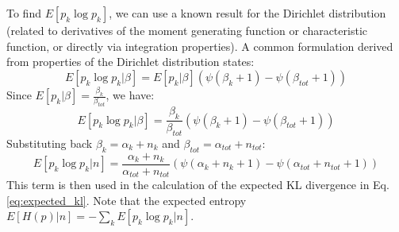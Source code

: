 \documentclass[journal]{IEEEtran}
\begin{document}
To find $E[p_k \log p_k]$, we can use a known result for the Dirichlet distribution (related to derivatives of the moment generating function or characteristic function, or directly via integration properties). A common formulation derived from properties of the Dirichlet distribution states:
\begin{equation}
E[p_k \log p_k | \beta] = E[p_k | \beta] \left( \psi(\beta_k + 1) - \psi(\beta_{tot} + 1) \right)
\end{equation}
Since $E[p_k | \beta] = \frac{\beta_k}{\beta_{tot}}$, we have:
\begin{equation}
E[p_k \log p_k | \beta] = \frac{\beta_k}{\beta_{tot}} \left( \psi(\beta_k + 1) - \psi(\beta_{tot} + 1) \right)
\end{equation}
Substituting back $\beta_k = \alpha_k + n_k$ and $\beta_{tot} = \alpha_{tot} + n_{tot}$:
\begin{equation}
E[p_k \log p_k | n] = \frac{\alpha_k + n_k}{\alpha_{tot} + n_{tot}} \left( \psi(\alpha_k + n_k + 1) - \psi(\alpha_{tot} + n_{tot} + 1) \right)
\end{equation}
This term is then used in the calculation of the expected KL divergence in Eq. \ref{eq:expected_kl}. Note that the expected entropy $E[H(p)|n] = - \sum_k E[p_k \log p_k | n]$.



\end{document}
